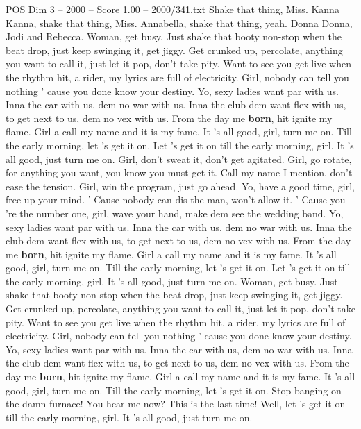 \begin{textsample}{POS Dim 3 – 2000 – Score 1.00 – 2000/341.txt}  \label{ex:f3_pos_040}
Shake that thing, Miss.
Kanna Kanna, shake that thing, Miss.
Annabella, shake that thing, yeah.
Donna Donna, Jodi and Rebecca.
Woman, get busy.
Just shake that booty non-stop when the beat drop, just keep swinging it, get jiggy.
Get crunked up, percolate, anything you want to call it, just let it pop, don't take pity.
Want to see you get live when the rhythm hit, a rider, my lyrics are full of electricity.
Girl, nobody can tell you nothing ' cause you done know your destiny.
Yo, sexy ladies want par with us.
Inna the car with us, dem no war with us.
Inna the club dem want flex with us, to get next to us, dem no vex with us.
From the day me \textbf{born}, hit ignite my flame.
Girl a call my name and it is my fame.
It 's all good, girl, turn me on.
Till the early morning, let 's get it on.
Let 's get it on till the early morning, girl.
It 's all good, just turn me on.
Girl, don't sweat it, don't get agitated.
Girl, go rotate, for anything you want, you know you must get it.
Call my name I mention, don't ease the tension.
Girl, win the program, just go ahead.
Yo, have a good time, girl, free up your mind. ' Cause nobody can dis the man, won't allow it. ' Cause you 're the number one, girl, wave your hand, make dem see the wedding band.
Yo, sexy ladies want par with us.
Inna the car with us, dem no war with us.
Inna the club dem want flex with us, to get next to us, dem no vex with us.
From the day me \textbf{born}, hit ignite my flame.
Girl a call my name and it is my fame.
It 's all good, girl, turn me on.
Till the early morning, let 's get it on.
Let 's get it on till the early morning, girl.
It 's all good, just turn me on.
Woman, get busy.
Just shake that booty non-stop when the beat drop, just keep swinging it, get jiggy.
Get crunked up, percolate, anything you want to call it, just let it pop, don't take pity.
Want to see you get live when the rhythm hit, a rider, my lyrics are full of electricity.
Girl, nobody can tell you nothing ' cause you done know your destiny.
Yo, sexy ladies want par with us.
Inna the car with us, dem no war with us.
Inna the club dem want flex with us, to get next to us, dem no vex with us.
From the day me \textbf{born}, hit ignite my flame.
Girl a call my name and it is my fame.
It 's all good, girl, turn me on.
Till the early morning, let 's get it on.
Stop banging on the damn furnace!
You hear me now?
This is the last time!
Well, let 's get it on till the early morning, girl.
It 's all good, just turn me on.

\end{textsample}
